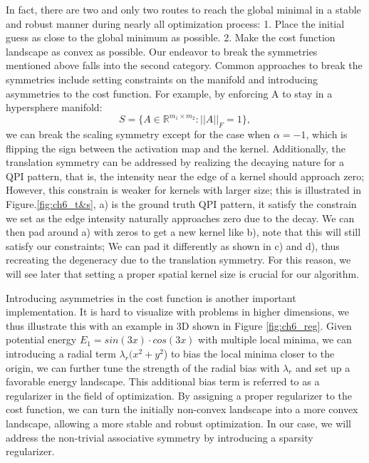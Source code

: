In fact, there are two and only two routes to reach the global minimal in a stable and robust manner during nearly all optimization process: 1. Place the initial guess as close to the global minimum as possible. 2. Make the cost function landscape as convex as possible. Our endeavor to break the symmetries mentioned above falls into the second category. Common approaches to break the symmetries include setting constraints on the manifold and introducing asymmetries to the cost function. For example, by enforcing A to stay in a hypersphere manifold: 
\begin{equation}
	\label{hypersphere}
	S = \{A \in \mathbb{R}^{m_1 \times m_2}: \vert\vert A \vert \vert_{F}= 1\},
\end{equation}
we can break the scaling symmetry except for the case when $\alpha = -1$, which is flipping the sign between the activation map and the kernel. Additionally, the translation symmetry can be addressed by realizing the decaying nature for a QPI pattern, that is, the intensity near the edge of a kernel should approach zero; However, this constrain is weaker for kernels with larger size; this is illustrated in Figure.\ref{fig:ch6_t&s}, a) is the ground truth QPI pattern, it satisfy the constrain we set as the edge intensity naturally approaches zero due to the decay. We can then pad around a) with zeros to get a new kernel like b), note that this will still satisfy our constraints; We can pad it differently as shown in c) and d), thus recreating the degeneracy due to the translation symmetry. For this reason, we will see later that setting a proper spatial kernel size is crucial for our algorithm. 

Introducing asymmetries in the cost function is another important implementation. It is hard to visualize with problems in higher dimensions, we thus illustrate this with an example in 3D shown in Figure \ref{fig:ch6_reg}. Given potential energy $E_1 = sin(3x)\cdot cos(3x)$ with multiple local minima, we can introducing a radial term $\lambda_r(x^2 + y^2$) to bias the local minima closer to the origin, we can further tune the strength of the radial bias with $\lambda_r$ and set up a favorable energy landscape. This additional bias term is referred to as a regularizer in the field of optimization. By assigning a proper regularizer to the cost function, we can turn the initially non-convex landscape into a more convex landscape, allowing a more stable and robust optimization. In our case, we will address the non-trivial associative symmetry by introducing a sparsity regularizer. 

